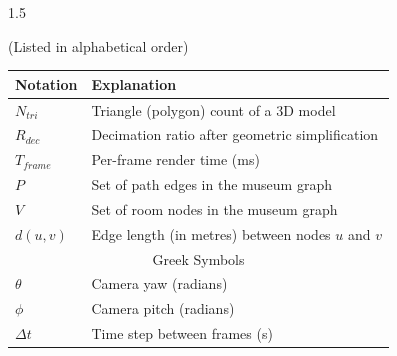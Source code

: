 \begin{spacing}{1.5}
\begin{center}
(Listed in alphabetical order)
\begin{tabular}{p{}|p{}}
\hline
Notation & Explanation \\
\hline
$N_{tri}$        & Triangle (polygon) count of a 3D model\\
$R_{dec}$        & Decimation ratio after geometric simplification\\
$T_{frame}$      & Per-frame render time (ms)\\
$P$              & Set of path edges in the museum graph\\
$V$              & Set of room nodes in the museum graph\\
$d(u,v)$         & Edge length (in metres) between nodes $u$ and $v$\\
\hline
\multicolumn{2}{c}{Greek Symbols}\\
\hline
$\theta$         & Camera yaw (radians)\\
$\phi$           & Camera pitch (radians)\\
$\Delta t$       & Time step between frames (s)\\
\hline
\end{tabular}
\end{center}

\end{spacing}

\newpage
{}
















